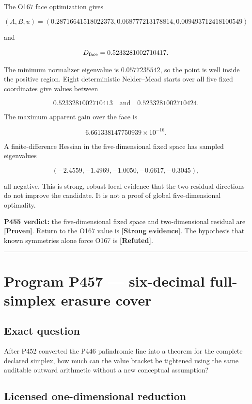 \documentclass[11pt,a4paper,openany]{report}
\newcommand{\statusProven}{\textcolor{fingreen}{[Proven]}}
\newcommand{\statusStrong}{\textcolor{finblue}{[Strong evidence]}}
\newcommand{\statusRefuted}{\textcolor{finred}{[Refuted]}}
\begin{document}
The O167 face optimization gives

\[
(A,B,u)=
(0.28716641518022373,
0.068777213178814,
0.009493712418100549)
\]

and

\[
D_{\rm face}=0.5233281002710417.
\]

The minimum normalizer eigenvalue is \(0.0577235542\), so the point is well inside the positive region. Eight deterministic Nelder--Mead starts over all five fixed coordinates give values between

\[
0.5233281002710413
\quad\text{and}\quad
0.5233281002710424.
\]

The maximum apparent gain over the face is

\[
6.661338147750939\times10^{-16}.
\]

A finite-difference Hessian in the five-dimensional fixed space has sampled eigenvalues

\[
(-2.4559,-1.4969,-1.0050,-0.6617,-0.3045),
\]

all negative. This is strong, robust local evidence that the two residual directions do not improve the candidate. It is not a proof of global five-dimensional optimality.

\textbf{P455 verdict:} the five-dimensional fixed space and two-dimensional residual are \textbf{\statusProven{}}. Return to the O167 value is \textbf{\statusStrong{}}. The hypothesis that known symmetries alone force O167 is \textbf{\statusRefuted{}}.

\par\medskip\hrule\medskip

\chapter{Program P457 --- six-decimal full-simplex erasure cover}

\section{Exact question}

After P452 converted the P446 palindromic line into a theorem for the complete declared simplex, how much can the value bracket be tightened using the same auditable outward arithmetic without a new conceptual assumption?

\section{Licensed one-dimensional reduction}
\end{document}
